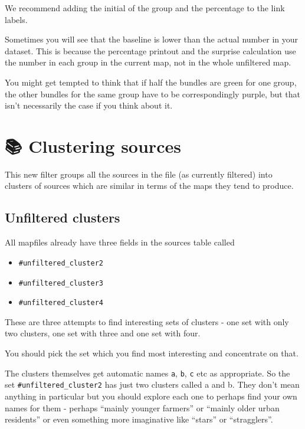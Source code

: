 \documentclass[
]{book}
\providecommand{\tightlist}{%
  \setlength{\itemsep}{0pt}\setlength{\parskip}{0pt}}
\begin{document}
We recommend adding the initial of the group and the percentage to the link labels.

Sometimes you will see that the baseline is lower than the actual number in your dataset. This is because the percentage printout and the surprise calculation use the number in each group in the current map, not in the whole unfiltered map.

You might get tempted to think that if half the bundles are green for one group, the other bundles for the same group have to be correspondingly purple, but that isn't necessarily the case if you think about it.

\hypertarget{cluster-sources}{%
\chapter{📚 Clustering sources}\label{cluster-sources}}

This new filter groups all the sources in the file (as currently filtered) into clusters of sources which are similar in terms of the maps they tend to produce.

\hypertarget{unfiltered-clusters}{%
\section{Unfiltered clusters}\label{unfiltered-clusters}}

All mapfiles already have three fields in the sources table called

\begin{itemize}
\tightlist
\item
  \texttt{\#unfiltered\_cluster2}
\item
  \texttt{\#unfiltered\_cluster3}
\item
  \texttt{\#unfiltered\_cluster4}
\end{itemize}

These are three attempts to find interesting sets of clusters - one set with only two clusters, one set with three and one set with four.

You should pick the set which you find most interesting and concentrate on that.

The clusters themselves get automatic names \texttt{a}, \texttt{b}, \texttt{c} etc as appropriate. So the set \texttt{\#unfiltered\_cluster2} has just two clusters called a and b. They don't mean anything in particular but you should explore each one to perhaps find your own names for them - perhaps ``mainly younger farmers'' or ``mainly older urban residents'' or even something more imaginative like ``stars'' or ``stragglers''.
\end{document}
